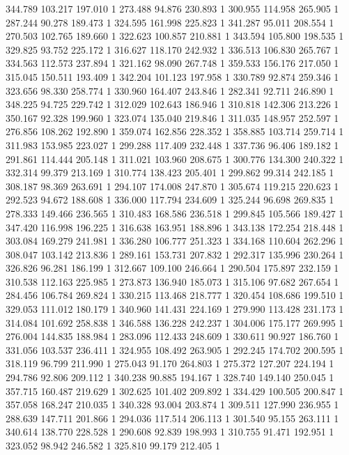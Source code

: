	344.789	103.217	197.010	1
	273.488	94.876	230.893	1
	300.955	114.958	265.905	1
	287.244	90.278	189.473	1
	324.595	161.998	225.823	1
	341.287	95.011	208.554	1
	270.503	102.765	189.660	1
	322.623	100.857	210.881	1
	343.594	105.800	198.535	1
	329.825	93.752	225.172	1
	316.627	118.170	242.932	1
	336.513	106.830	265.767	1
	334.563	112.573	237.894	1
	321.162	98.090	267.748	1
	359.533	156.176	217.050	1
	315.045	150.511	193.409	1
	342.204	101.123	197.958	1
	330.789	92.874	259.346	1
	323.656	98.330	258.774	1
	330.960	164.407	243.846	1
	282.341	92.711	246.890	1
	348.225	94.725	229.742	1
	312.029	102.643	186.946	1
	310.818	142.306	213.226	1
	350.167	92.328	199.960	1
	323.074	135.040	219.846	1
	311.035	148.957	252.597	1
	276.856	108.262	192.890	1
	359.074	162.856	228.352	1
	358.885	103.714	259.714	1
	311.983	153.985	223.027	1
	299.288	117.409	232.448	1
	337.736	96.406	189.182	1
	291.861	114.444	205.148	1
	311.021	103.960	208.675	1
	300.776	134.300	240.322	1
	332.314	99.379	213.169	1
	310.774	138.423	205.401	1
	299.862	99.314	242.185	1
	308.187	98.369	263.691	1
	294.107	174.008	247.870	1
	305.674	119.215	220.623	1
	292.523	94.672	188.608	1
	336.000	117.794	234.609	1
	325.244	96.698	269.835	1
	278.333	149.466	236.565	1
	310.483	168.586	236.518	1
	299.845	105.566	189.427	1
	347.420	116.998	196.225	1
	316.638	163.951	188.896	1
	343.138	172.254	218.448	1
	303.084	169.279	241.981	1
	336.280	106.777	251.323	1
	334.168	110.604	262.296	1
	308.047	103.142	213.836	1
	289.161	153.731	207.832	1
	292.317	135.996	230.264	1
	326.826	96.281	186.199	1
	312.667	109.100	246.664	1
	290.504	175.897	232.159	1
	310.538	112.163	225.985	1
	273.873	136.940	185.073	1
	315.106	97.682	267.654	1
	284.456	106.784	269.824	1
	330.215	113.468	218.777	1
	320.454	108.686	199.510	1
	329.053	111.012	180.179	1
	340.960	141.431	224.169	1
	279.990	113.428	231.173	1
	314.084	101.692	258.838	1
	346.588	136.228	242.237	1
	304.006	175.177	269.995	1
	276.004	144.835	188.984	1
	283.096	112.433	248.609	1
	330.611	90.927	186.760	1
	331.056	103.537	236.411	1
	324.955	108.492	263.905	1
	292.245	174.702	200.595	1
	318.119	96.799	211.990	1
	275.043	91.170	264.803	1
	275.372	127.207	224.194	1
	294.786	92.806	209.112	1
	340.238	90.885	194.167	1
	328.740	149.140	250.045	1
	357.715	160.487	219.629	1
	302.625	101.402	209.892	1
	334.429	100.505	200.847	1
	357.058	168.247	210.035	1
	340.328	93.004	203.874	1
	309.511	127.990	236.955	1
	288.639	147.711	201.866	1
	294.036	117.514	206.113	1
	301.540	95.155	263.111	1
	340.614	138.770	228.528	1
	290.608	92.839	198.993	1
	310.755	91.471	192.951	1
	323.052	98.942	246.582	1
	325.810	99.179	212.405	1
